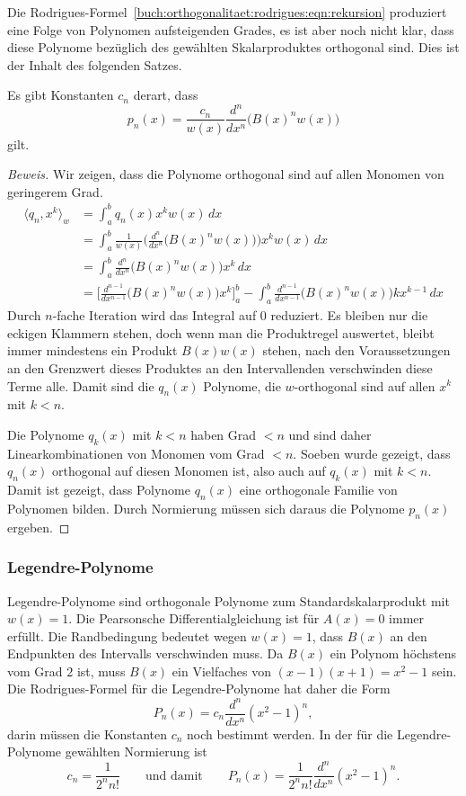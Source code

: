 Die Rodrigues-Formel~\eqref{buch:orthogonalitaet:rodrigues:eqn:rekursion}
produziert eine Folge von Polynomen aufsteigenden Grades, es ist aber
noch nicht klar, dass diese Polynome bezüglich des gewählten Skalarproduktes
orthogonal sind.
Dies ist der Inhalt des folgenden Satzes.

\begin{satz}
Es gibt Konstanten $c_n$ derart, dass
\[
p_n(x)
=
\frac{c_n}{w(x)} \frac{d^n}{dx^n} \bigl(B(x)^n w(x)\bigr) 
\]
gilt.
\end{satz}

\begin{proof}[Beweis]
Wir zeigen, dass die Polynome orthogonal sind auf allen Monomen
von geringerem Grad.
\begin{align*}
\langle q_n, x^k\rangle_w
&=
\int_a^b q_n(x)x^kw(x)\,dx
\\
&=
\int_a^b \frac{1}{w(x)}
\biggl(\frac{d^n}{dx^n}\bigl(B(x)^n w(x)\bigr)\biggr)
x^k w(x)\,dx
\\
&=
\int_a^b \frac{d^n}{dx^n}\bigl(B(x)^n w(x)\bigr) x^k \,dx
\\
&=
\biggl[\frac{d^{n-1}}{dx^{n-1}}\bigl(B(x)^n w(x)\bigr) x^k \biggr]_a^b
-
\int_a^b \frac{d^{n-1}}{dx^{n-1}}\bigl(B(x)^n w(x)\bigr)kx^{k-1}\,dx
\end{align*}
Durch $n$-fache Iteration wird das Integral auf $0$ reduziert.
Es bleiben nur die eckigen Klammern stehen, doch wenn man die Produktregel
auswertet, bleibt immer mindestens ein Produkt $B(x)w(x)$ stehen,
nach den Voraussetzungen an den Grenzwert dieses Produktes an den
Intervallenden verschwinden diese Terme alle.
Damit sind die $q_n(x)$ Polynome, die $w$-orthogonal sind auf allen
$x^k$ mit $k<n$.

Die Polynome $q_k(x)$ mit $k< n$ haben Grad $<n$ und sind daher
Linearkombinationen von Monomen vom Grad $<n$.
Soeben wurde gezeigt, dass $q_n(x)$ orthogonal auf diesen Monomen
ist, also auch auf $q_k(x)$ mit $k<n$.
Damit ist gezeigt, dass Polynome $q_n(x)$ eine orthogonale Familie
von Polynomen bilden.
Durch Normierung müssen sich daraus die Polynome $p_n(x)$ ergeben.
\end{proof}

%
%
\subsubsection{Legendre-Polynome}
Legendre-Polynome sind orthogonale Polynome zum Standardskalarprodukt
mit $w(x)=1$.
Die Pearsonsche Differentialgleichung ist für $A(x)=0$ immer erfüllt.
Die Randbedingung bedeutet wegen $w(x)=1$, dass $B(x)$ an den
Endpunkten des Intervalls verschwinden muss.
Da $B(x)$ ein Polynom höchstens vom Grad $2$ ist, muss $B(x)$ ein
Vielfaches von $(x-1)(x+1)=x^2-1$ sein.
Die Rodrigues-Formel für die Legendre-Polynome hat daher die Form
\[
P_n(x)
=
c_n
\frac{d^n}{dx^n}
(x^2-1)^n,
\]
darin müssen die Konstanten $c_n$ noch bestimmt werden.
In der für die Legendre-Polynome gewählten Normierung ist
\[
c_n = \frac1{2^n n!}
\qquad\text{und damit}\qquad
P_n(x)
=
\frac{1}{2^nn!}
\frac{d^n}{dx^n}
(x^2-1)^n.
\]

